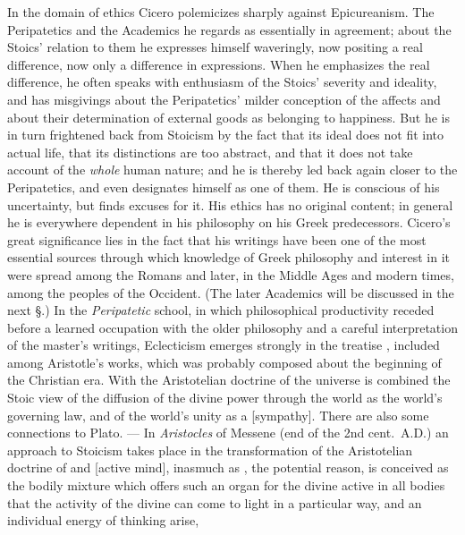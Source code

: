In the domain of ethics Cicero polemicizes sharply against Epicureanism. The Peripatetics and the Academics he regards as
essentially in agreement; about the Stoics' relation to them
he expresses himself waveringly, now positing a real difference, now only a difference in expressions.
When he emphasizes the real difference, he often speaks with
enthusiasm of the Stoics' severity and ideality, and has misgivings about the Peripatetics' milder conception of the affects and about their determination of external goods as belonging to happiness. But he is in turn frightened back from Stoicism by the fact that its ideal does not fit into
actual life, that its distinctions are too abstract, and
that it does not take account of the \emph{whole} human nature;
and he is thereby led back again closer to the Peripatetics, and
even designates himself as one of them. He is conscious of his uncertainty, but finds excuses for it. His ethics has no original content; in general he is
everywhere dependent in his philosophy on his Greek predecessors.
Cicero's great significance lies in the fact that his writings have
been one of the most essential sources through which knowledge of Greek philosophy and interest in it were
spread among the Romans and later, in the Middle Ages
and modern times, among the peoples of the Occident. (The later
Academics will be discussed in the next §.)
In the \emph{Peripatetic} school, in which philosophical
productivity receded before a learned occupation with the
older philosophy and a careful interpretation of the master's
writings, Eclecticism emerges strongly in the treatise \emph{}, included among Aristotle's works, which was probably
composed about the beginning of the Christian era. With
the Aristotelian doctrine of the universe is combined the Stoic
view of the diffusion of the divine power through the
world as the world's governing law, and of the world's unity as
a  [sympathy]. There are also some connections to Plato. ---
In \emph{Aristocles} of Messene (end of the 2nd cent.\
A.D.) an approach to Stoicism takes place in the transformation
of the Aristotelian doctrine of  and  [active mind], inasmuch as , the potential reason, is conceived
as the bodily mixture which offers such an organ
for the divine  active in all bodies that the
activity of the divine \gk{νοῦς} can come to light in a
particular way, and an individual energy of thinking arise,
